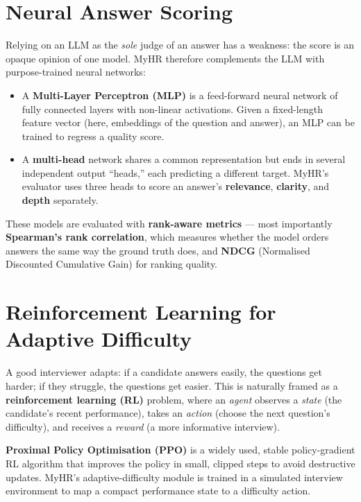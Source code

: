 \documentclass[12pt,a4paper,oneside]{report}
\begin{document}
\section{Neural Answer Scoring}

Relying on an LLM as the \textit{sole} judge of an answer has a weakness: the score is an
opaque opinion of one model. MyHR therefore complements the LLM with purpose-trained neural
networks:

\begin{itemize}
  \item A \textbf{Multi-Layer Perceptron (MLP)} is a feed-forward neural network of fully
    connected layers with non-linear activations. Given a fixed-length feature vector (here,
    embeddings of the question and answer), an MLP can be trained to regress a quality score.
  \item A \textbf{multi-head} network shares a common representation but ends in several
    independent output ``heads,'' each predicting a different target. MyHR's evaluator uses
    three heads to score an answer's \textbf{relevance}, \textbf{clarity}, and \textbf{depth}
    separately.
\end{itemize}

These models are evaluated with \textbf{rank-aware metrics} --- most importantly
\textbf{Spearman's rank correlation}, which measures whether the model orders answers the same
way the ground truth does, and \textbf{NDCG} (Normalised Discounted Cumulative Gain) for
ranking quality.

\section{Reinforcement Learning for Adaptive Difficulty}

A good interviewer adapts: if a candidate answers easily, the questions get harder; if they
struggle, the questions get easier. This is naturally framed as a \textbf{reinforcement learning
(RL)} problem, where an \textit{agent} observes a \textit{state} (the candidate's recent
performance), takes an \textit{action} (choose the next question's difficulty), and receives a
\textit{reward} (a more informative interview).

\textbf{Proximal Policy Optimisation (PPO)} is a widely used, stable policy-gradient RL
algorithm that improves the policy in small, clipped steps to avoid destructive updates.
MyHR's adaptive-difficulty module is trained in a simulated interview environment to map a
compact performance state to a difficulty action.
\end{document}
